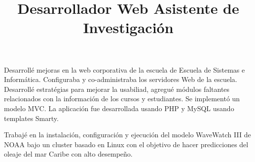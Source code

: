 \begin{resume}
\title{\textbf{Desarrollador Web} }
\begin{position}
Desarroll\'{e} mejoras en la web corporativa de la escuela de Escuela
de Sistemas e Inform\'{a}tica. Configuraba y  co-administraba los
servidores Web de la escuela. Desarroll\'{e} estrat\'{e}gias para
mejorar la usabiliad, agregu\'{e} m\'{o}dulos faltantes relacionados
con la informaci\'{o}n de los cursos y estudiantes. Se implement\'{o}
un modelo MVC. La aplicaci\'{o}n fue desarrollada usando PHP y
MySQL usando templates Smarty.
\end{position}

 \title{\textbf{Asistente de Investigaci\'{o}n}}
 \begin{position}
 Trabaj\'{e} en la instalaci\'{o}n, configuraci\'{o}n y ejecuci\'{o}n  del modelo WaveWatch III de NOAA bajo un cluster basado en Linux con el objetivo de hacer predicciones del oleaje del mar Caribe con alto desempe\~{n}o.

 \end{position}


\end{resume}

